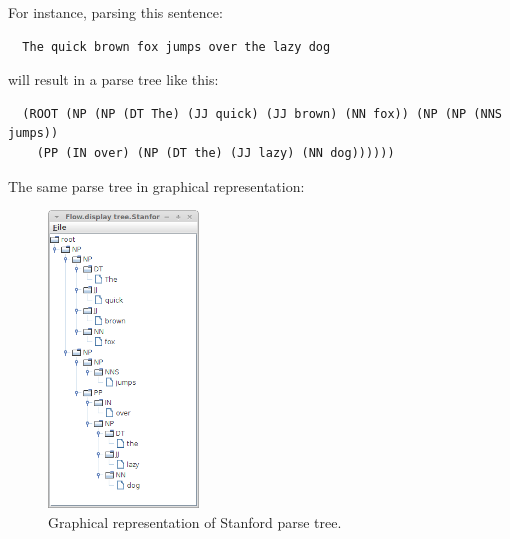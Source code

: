 \documentclass[a4paper]{book}
\begin{document}
\noindent For instance, parsing this sentence:
\begin{verbatim}
  The quick brown fox jumps over the lazy dog
\end{verbatim}
will result in a parse tree like this:
\begin{verbatim}
  (ROOT (NP (NP (DT The) (JJ quick) (JJ brown) (NN fox)) (NP (NP (NNS jumps)) 
    (PP (IN over) (NP (DT the) (JJ lazy) (NN dog))))))
\end{verbatim}
The same parse tree in graphical representation:
\begin{figure}[htb]
  \centering
  \includegraphics[width=4.0cm]{images/parse-tree.png}
  \caption{Graphical representation of Stanford parse tree.}
  \label{parse-tree}
\end{figure}

\end{document}
